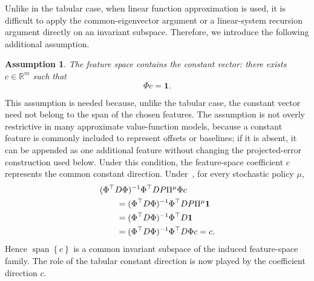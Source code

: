 \documentclass[letterpaper]{article}
\numberwithin{equation}{section}
\newtheorem{assumption}{Assumption}[section]
\newcommand{\R}{\mathbb{R}}
\begin{document}
Unlike in the tabular case, when linear function approximation is used, it is difficult to apply the common-eigenvector argument or a linear-system recursion argument directly on an invariant subspace. Therefore, we introduce the following additional assumption.


\begin{assumption}
\label{ass:constant-feature}
The feature space contains the constant vector: there exists
$c\in\R^m$ such that
\begin{equation*}
  \Phi c=\mathbf{1}.
\end{equation*}
\end{assumption}
This assumption is needed because, unlike the tabular case, the constant vector need not belong to the span of the chosen features. The assumption is not overly restrictive in many approximate value-function models, because a constant feature is commonly included to represent offsets or baselines; if it is absent, it can be appended as one additional feature without changing the projected-error construction used below. Under this condition, the feature-space coefficient $c$ represents the common constant direction.
Under~, for every stochastic policy $\mu$,
\begin{align}
  &(\Phi^\top D\Phi)^{-1}\Phi^\top D P\Pi^\mu\Phi c \notag\\
  &\qquad=(\Phi^\top D\Phi)^{-1}\Phi^\top D P\Pi^\mu\mathbf{1} \notag\\
  &\qquad=(\Phi^\top D\Phi)^{-1}\Phi^\top D\mathbf{1} \notag\\
  &\qquad=(\Phi^\top D\Phi)^{-1}\Phi^\top D\Phi c
  =c.
  \label{eq:feature-constant-invariant}
\end{align}
Hence $\operatorname{span}\left\{c\right\}$ is a common invariant subspace of the induced feature-space
family. The role of the tabular constant direction is now played by the
coefficient direction $c$.
\end{document}
